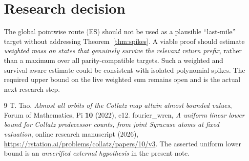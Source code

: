 \documentclass[11pt,a4paper]{article}
\begin{document}
\section{Research decision}
The global pointwise route (ES) should not be used as a plausible ``last-mile'' target without addressing Theorem~\ref{thm:spikes}.  A viable proof should estimate \emph{weighted mass on states that genuinely survive the relevant return prefix}, rather than a maximum over all parity-compatible targets.  Such a weighted and survival-aware estimate could be consistent with isolated polynomial spikes.  The required upper bound on the live weighted sum remains open and is the actual next research step.

\begin{thebibliography}{9}
 T. Tao, \emph{Almost all orbits of the Collatz map attain almost bounded values}, Forum of Mathematics, Pi \textbf{10} (2022), e12.
 fourier\_wren, \emph{A uniform linear lower bound for Collatz predecessor counts, from joint Syracuse atoms at fixed valuation}, online research manuscript (2026), \url{https://rstation.ai/problems/collatz/papers/10/v3}.  The asserted uniform lower bound is an \emph{unverified external hypothesis} in the present note.
\end{thebibliography}
\end{document}
